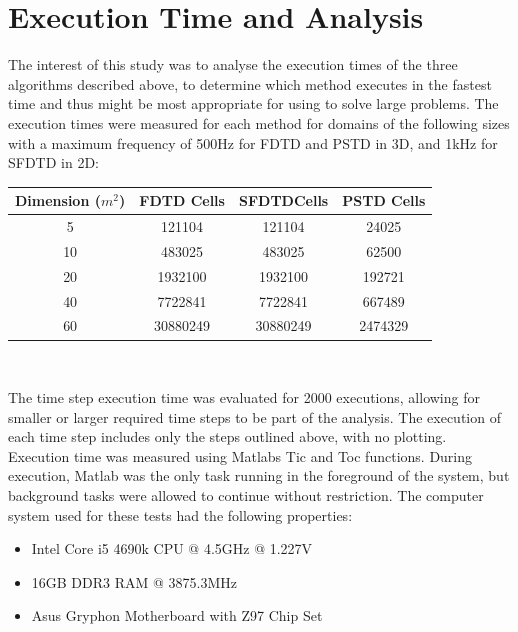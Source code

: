 %
%
%
\chapter{Execution Time and Analysis}
\label{Introduction}
The interest of this study was to analyse the execution times of the three algorithms described above, to determine which method executes in the fastest time and thus might be most appropriate for using to solve large problems. The execution times were measured for each method for domains of the following sizes with a maximum frequency of 500Hz for FDTD and PSTD in 3D, and 1kHz for SFDTD in 2D:\\
\begin{center}
\begin{tabular}{|c|c|c|c|} 
  \hline
 Dimension ($m^2$) & FDTD Cells & SFDTDCells & PSTD Cells \\
 \hline
 5 & 121104	& 121104 & 24025\\ 
 10 & 483025 & 483025 & 62500\\  
 20 & 1932100 & 1932100 & 192721\\ 
 40 & 7722841 & 7722841 & 667489\\ 
 60 & 30880249 & 30880249 & 2474329\\ 
 \hline
\end{tabular}\\
\end{center}

The time step execution time was evaluated for 2000 executions, allowing for smaller or larger required time steps to be part of the analysis. The execution of each time step includes only the steps outlined above, with no plotting. Execution time was measured using Matlabs Tic and Toc functions. During execution, Matlab was the only task running in the foreground of the system, but background tasks were allowed to continue without restriction. The computer system used for these tests had the following properties:\\

\begin{itemize}
\item Intel Core i5 4690k CPU @ 4.5GHz @ 1.227V
\item 16GB DDR3 RAM @ 3875.3MHz
\item Asus Gryphon Motherboard with Z97 Chip Set
\end{itemize}



